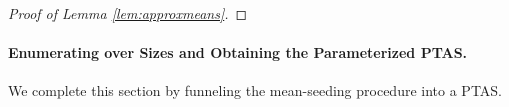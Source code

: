 \documentclass[11pt]{article}
\newtheorem{theorem}{Theorem}[section]
\begin{document}
\begin{proof}[Proof of Lemma \ref{lem:approxmeans}]
\end{proof}

\paragraph{Enumerating over Sizes and Obtaining the Parameterized PTAS.}
We complete this section by funneling the mean-seeding procedure into a PTAS.
\end{document}
